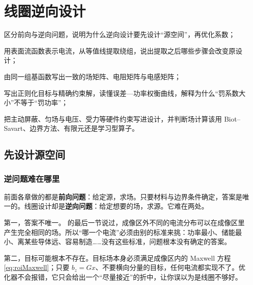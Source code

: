 \chapter{线圈逆向设计}\label{ch:coils}

\begin{chapterguide}
\begin{guidegoals}
\item 区分前向与逆向问题，说明为什么逆向设计要先设计“源空间”，再优化系数；
\item 用表面流函数表示电流，从等值线提取绕组，说出提取之后哪些步骤会改变原设计；
\item 由同一组基函数写出一致的场矩阵、电阻矩阵与电感矩阵；
\item 写出正则化目标与精确约束解，读懂误差—功率权衡曲线，解释为什么“罚系数大小”不等于“罚功率”；
\item 把主动屏蔽、匀场与电压、受力等硬件约束写进设计，并判断场计算该用 Biot--Savart、边界方法、有限元还是学习型算子。
\end{guidegoals}
\end{chapterguide}

\section{先设计源空间}\label{sec:coils-sourcespace}

\subsection{逆问题难在哪里}
前面各章做的都是\textbf{前向问题}：给定源，求场。只要材料与边界条件确定，答案是唯一的。线圈设计却是\textbf{逆向问题}：给定想要的场，求源。它难在两处。

第一，答案不唯一。 的最后一节说过，成像区外不同的电流分布可以在成像区里产生完全相同的场。所以“哪一个电流”必须由别的标准来挑：功率最小、储能最小、离某些导体远、容易制造……没有这些标准，问题根本没有确定的答案。

第二，目标可能根本不存在。目标场本身必须满足成像区内的 Maxwell 方程 \eqref{eq:roiMaxwell}；只要 $b_z=Gx$、不要横向分量的目标，任何电流都实现不了。优化器不会报错，它只会给出一个“尽量接近”的折中，让你误以为是线圈不够好。

